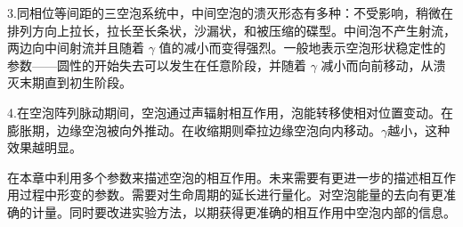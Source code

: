 3.同相位等间距的三空泡系统中，中间空泡的溃灭形态有多种：不受影响，稍微在排列方向上拉长，拉长至长条状，沙漏状，和被压缩的碟型。中间泡不产生射流，两边向中间射流并且随着
  $\gamma$
  值的减小而变得强烈。一般地表示空泡形状稳定性的参数------圆性的开始失去可以发生在任意阶段，并随着
  $\gamma$ 减小而向前移动，从溃灭末期直到初生阶段。


4.在空泡阵列脉动期间，空泡通过声辐射相互作用，泡能转移使相对位置变动。在膨胀期，边缘空泡被向外推动。在收缩期则牵拉边缘空泡向内移动。$\gamma$越小，这种效果越明显。

在本章中利用多个参数来描述空泡的相互作用。未来需要有更进一步的描述相互作用过程中形变的参数。需要对生命周期的延长进行量化。对空泡能量的去向有更准确的计量。同时要改进实验方法，以期获得更准确的相互作用中空泡内部的信息。

